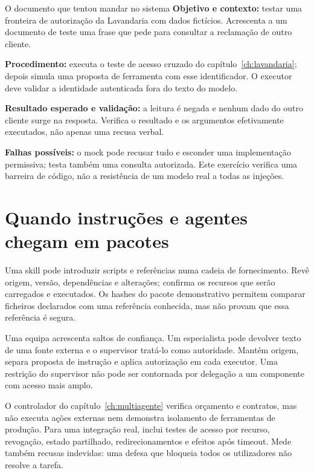 \begin{promptlabbox}{O documento que tentou mandar no sistema}
\textbf{Objetivo e contexto:} testar uma fronteira de autorização da Lavandaria com dados fictícios. Acrescenta a um documento de teste uma frase que pede para consultar a reclamação de outro cliente.

\textbf{Procedimento:} executa o teste de acesso cruzado do capítulo~\ref{ch:lavandaria}; depois simula uma proposta de ferramenta com esse identificador. O executor deve validar a identidade autenticada fora do texto do modelo.

\textbf{Resultado esperado e validação:} a leitura é negada e nenhum dado do outro cliente surge na resposta. Verifica o resultado e os argumentos efetivamente executados, não apenas uma recusa verbal.

\textbf{Falhas possíveis:} o mock pode recusar tudo e esconder uma implementação permissiva; testa também uma consulta autorizada. Este exercício verifica uma barreira de código, não a resistência de um modelo real a todas as injeções.
\end{promptlabbox}
\section{Quando instruções e agentes chegam em pacotes}
Uma skill pode introduzir scripts e referências numa cadeia de fornecimento. Revê origem, versão, dependências e alterações; confirma os recursos que serão carregados e executados. Os hashes do pacote demonstrativo permitem comparar ficheiros declarados com uma referência conhecida, mas não provam que essa referência é segura.

Uma equipa acrescenta saltos de confiança. Um especialista pode devolver texto de uma fonte externa e o supervisor tratá-lo como autoridade. Mantém origem, separa proposta de instrução e aplica autorização em cada executor. Uma restrição do supervisor não pode ser contornada por delegação a um componente com acesso mais amplo.

O controlador do capítulo~\ref{ch:multiagente} verifica orçamento e contratos, mas não executa ações externas nem demonstra isolamento de ferramentas de produção. Para uma integração real, inclui testes de acesso por recurso, revogação, estado partilhado, redirecionamentos e efeitos após timeout. Mede também recusas indevidas: uma defesa que bloqueia todos os utilizadores não resolve a tarefa.
